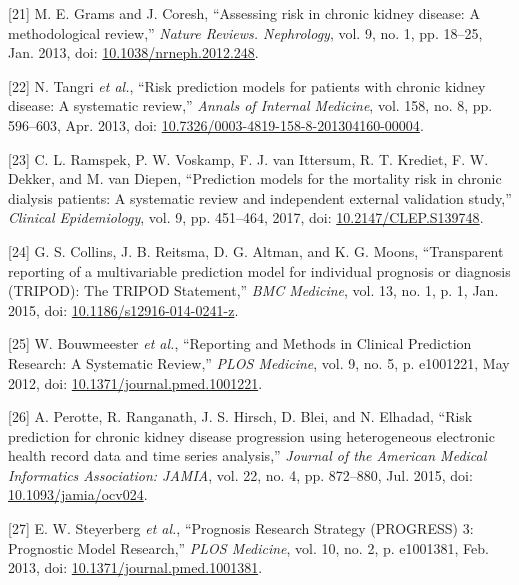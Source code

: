\documentclass[12pt,twoside]{reedthesis}
\newenvironment{cslreferences}%
  {}%
  {\par}
\begin{document}
\begin{cslreferences}
\leavevmode\hypertarget{ref-grams_assessing_2013}{}%
{[}21{]} M. E. Grams and J. Coresh, ``Assessing risk in chronic kidney disease: A methodological review,'' \emph{Nature Reviews. Nephrology}, vol. 9, no. 1, pp. 18--25, Jan. 2013, doi: \href{https://doi.org/10.1038/nrneph.2012.248}{10.1038/nrneph.2012.248}.

\leavevmode\hypertarget{ref-tangri_risk_2013}{}%
{[}22{]} N. Tangri \emph{et al.}, ``Risk prediction models for patients with chronic kidney disease: A systematic review,'' \emph{Annals of Internal Medicine}, vol. 158, no. 8, pp. 596--603, Apr. 2013, doi: \href{https://doi.org/10.7326/0003-4819-158-8-201304160-00004}{10.7326/0003-4819-158-8-201304160-00004}.

\leavevmode\hypertarget{ref-ramspek_prediction_2017}{}%
{[}23{]} C. L. Ramspek, P. W. Voskamp, F. J. van Ittersum, R. T. Krediet, F. W. Dekker, and M. van Diepen, ``Prediction models for the mortality risk in chronic dialysis patients: A systematic review and independent external validation study,'' \emph{Clinical Epidemiology}, vol. 9, pp. 451--464, 2017, doi: \href{https://doi.org/10.2147/CLEP.S139748}{10.2147/CLEP.S139748}.

\leavevmode\hypertarget{ref-collins_transparent_2015}{}%
{[}24{]} G. S. Collins, J. B. Reitsma, D. G. Altman, and K. G. Moons, ``Transparent reporting of a multivariable prediction model for individual prognosis or diagnosis (TRIPOD): The TRIPOD Statement,'' \emph{BMC Medicine}, vol. 13, no. 1, p. 1, Jan. 2015, doi: \href{https://doi.org/10.1186/s12916-014-0241-z}{10.1186/s12916-014-0241-z}.

\leavevmode\hypertarget{ref-bouwmeester_reporting_2012-1}{}%
{[}25{]} W. Bouwmeester \emph{et al.}, ``Reporting and Methods in Clinical Prediction Research: A Systematic Review,'' \emph{PLOS Medicine}, vol. 9, no. 5, p. e1001221, May 2012, doi: \href{https://doi.org/10.1371/journal.pmed.1001221}{10.1371/journal.pmed.1001221}.

\leavevmode\hypertarget{ref-perotte_risk_2015}{}%
{[}26{]} A. Perotte, R. Ranganath, J. S. Hirsch, D. Blei, and N. Elhadad, ``Risk prediction for chronic kidney disease progression using heterogeneous electronic health record data and time series analysis,'' \emph{Journal of the American Medical Informatics Association: JAMIA}, vol. 22, no. 4, pp. 872--880, Jul. 2015, doi: \href{https://doi.org/10.1093/jamia/ocv024}{10.1093/jamia/ocv024}.

\leavevmode\hypertarget{ref-steyerberg_prognosis_2013}{}%
{[}27{]} E. W. Steyerberg \emph{et al.}, ``Prognosis Research Strategy (PROGRESS) 3: Prognostic Model Research,'' \emph{PLOS Medicine}, vol. 10, no. 2, p. e1001381, Feb. 2013, doi: \href{https://doi.org/10.1371/journal.pmed.1001381}{10.1371/journal.pmed.1001381}.


\end{cslreferences}
\end{document}
